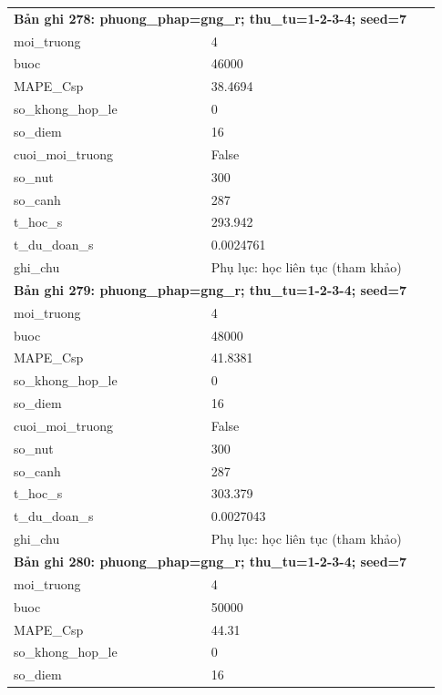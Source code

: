 \begin{longtable}{p{0.43\linewidth}p{0.50\linewidth}}
\midrule
\multicolumn{2}{p{0.95\linewidth}}{\textbf{Bản ghi 278: phuong\_phap=gng\_r; thu\_tu=1-2-3-4; seed=7}} \\
moi\_\allowbreak truong & 4 \\
buoc & 46000 \\
MAPE\_\allowbreak Csp & 38.4694 \\
so\_\allowbreak khong\_\allowbreak hop\_\allowbreak le & 0 \\
so\_\allowbreak diem & 16 \\
cuoi\_\allowbreak moi\_\allowbreak truong & False \\
so\_\allowbreak nut & 300 \\
so\_\allowbreak canh & 287 \\
t\_\allowbreak hoc\_\allowbreak s & 293.942 \\
t\_\allowbreak du\_\allowbreak doan\_\allowbreak s & 0.0024761 \\
ghi\_\allowbreak chu & Phụ lục: học liên tục (tham khảo) \\
\midrule
\multicolumn{2}{p{0.95\linewidth}}{\textbf{Bản ghi 279: phuong\_phap=gng\_r; thu\_tu=1-2-3-4; seed=7}} \\
moi\_\allowbreak truong & 4 \\
buoc & 48000 \\
MAPE\_\allowbreak Csp & 41.8381 \\
so\_\allowbreak khong\_\allowbreak hop\_\allowbreak le & 0 \\
so\_\allowbreak diem & 16 \\
cuoi\_\allowbreak moi\_\allowbreak truong & False \\
so\_\allowbreak nut & 300 \\
so\_\allowbreak canh & 287 \\
t\_\allowbreak hoc\_\allowbreak s & 303.379 \\
t\_\allowbreak du\_\allowbreak doan\_\allowbreak s & 0.0027043 \\
ghi\_\allowbreak chu & Phụ lục: học liên tục (tham khảo) \\
\midrule
\multicolumn{2}{p{0.95\linewidth}}{\textbf{Bản ghi 280: phuong\_phap=gng\_r; thu\_tu=1-2-3-4; seed=7}} \\
moi\_\allowbreak truong & 4 \\
buoc & 50000 \\
MAPE\_\allowbreak Csp & 44.31 \\
so\_\allowbreak khong\_\allowbreak hop\_\allowbreak le & 0 \\
so\_\allowbreak diem & 16 \\

\end{longtable}
